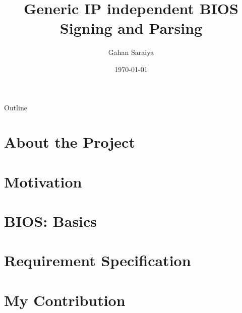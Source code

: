 \documentclass{beamer}
\title{Generic IP independent BIOS Signing and Parsing}
\date{\today}
\author[Gahan Saraiya]{Gahan Saraiya}
\institute[18MCEC10]
{
  Institute of Technology\\
  Nirma University
}
\begin{document}
\begin{frame}
\titlepage
\end{frame}


    
\begin{frame}{Outline}
    \tableofcontents
\end{frame}

\section{About the Project}


\section{Motivation}


\section{BIOS: Basics}
% 


\section{Requirement Specification}


\section{My Contribution}


%
%
%
\end{document}
